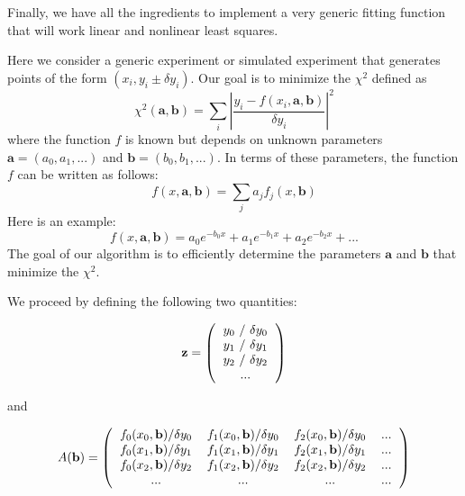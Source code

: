 \documentclass[justified, sixbynine]{tufte-book}
\theoremstyle{plain}%
\newtheorem * {corollary}{Corollary}
\theoremstyle{definition}
\theoremstyle{remark}
\newtheorem * {remark}{Remark}
\newtheorem * {note}{Note}
\begin{document}
\begin{fullwidth}
Finally, we have all the ingredients to implement a very generic fitting function that will work linear and nonlinear least squares.

Here we consider a generic experiment or simulated experiment that generates points of the form $(x_i, y_i \pm \delta y_i)$. Our goal is to minimize the $\chi^2$ defined as
\begin{equation}
\chi^2(\mathbf{a}, \mathbf{b}) = \sum _i \left|
\frac{y_i - f(x_i, \mathbf{a}, \mathbf{b})}{\delta y_i}
\right|^2
\end{equation}
where the function $f$ is known but depends on unknown parameters $\mathbf{a}=(a_0, a_1, ...)$ and $\mathbf{b}=(b_0, b_1, ...)$. In terms of these parameters, the function $f$ can be written as follows:
\begin{equation}
f(x, \mathbf{a}, \mathbf{b}) = \sum_j a_j f_j(x, \mathbf{b})
\end{equation}
Here is an example:
\begin{equation}
f(x, \mathbf{a}, \mathbf{b}) = a_0 e^{-b_0 x} + a_1 e^{-b_1 x} + a_2 e^{-b_2 x} + ...
\end{equation}
The goal of our algorithm is to efficiently determine the parameters $\mathbf{a}$ and $\mathbf{b}$ that minimize the $\chi^2$.

We proceed by defining the following two quantities:

\begin{equation}
\mathbf{z} = \left(
\begin{tabular}{c}
$y_0$ / $\delta y_0$ \\
$y_1$ / $\delta y_1$ \\
$y_2$ / $\delta y_2$ \\
...
\end{tabular}
\right)
\end{equation}

and

\begin{equation}
A(\mathbf{b}) = \left(
\begin{tabular}{cccc}
$f_0(x_0, \mathbf{b})/\delta y_0$ &
$f_1(x_0, \mathbf{b})/\delta y_0$ &
$f_2(x_0, \mathbf{b})/\delta y_0$ & ... \\
$f_0(x_1, \mathbf{b})/\delta y_1$ &
$f_1(x_1, \mathbf{b})/\delta y_1$ &
$f_2(x_1, \mathbf{b})/\delta y_1$ & ... \\
$f_0(x_2, \mathbf{b})/\delta y_2$ &
$f_1(x_2, \mathbf{b})/\delta y_2$ &
$f_2(x_2, \mathbf{b})/\delta y_2$ & ... \\
... & ... & ... & ...
\end{tabular}
\right)
\end{equation}


\end{fullwidth}
\end{document}
